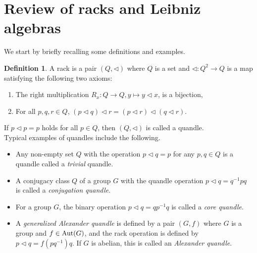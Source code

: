 \documentclass[12pt]{amsart}
\theoremstyle{plain}
\theoremstyle{definition}
\newtheorem{definition}[theorem]{Definition}
\begin{document}
\vspace{5mm}

\section{Review of racks and Leibniz algebras}\label{Sec2}
We start by briefly recalling some definitions and examples.
\begin{definition}
     A rack is a pair $(Q,\triangleleft)$ where $Q$ is a set and $\triangleleft:Q^2 \to Q$ is a map satisfying the following two axioms:

\begin{enumerate}

    \item 
 The right multiplication $R_x: Q \to Q, y \mapsto y \triangleleft x$, is a bijection,

\item 
For all $p,q,r \in Q$, $ (p  \triangleleft q )\triangleleft r = (p  \triangleleft r )\triangleleft (q  \triangleleft r).$ 
\end{enumerate}

\end{definition}
If $p  \triangleleft p=p$ holds for all $p \in Q$, then $(Q,\triangleleft)$ is called a quandle.\\

 Typical examples of quandles include the following. 
  \begin{itemize}

  \item
Any non-empty set $Q$ with the operation $p \triangleleft q=p$ for any $p,q \in Q$ is
a quandle called a  {\it trivial} quandle.

\item
A conjugacy class $Q$ of a group $G$ with the quandle operation $p \triangleleft q=q^{-1}pq $ is called a {\it conjugation quandle}. 

\item
For a group $G$, the binary operation $p \triangleleft q=q p^{-1}q $ is called a {\it core quandle}. 


  \item 
  A {\it generalized Alexander quandle} is defined  by 
a pair $(G, f)$ where 
$G$ is a  group and $f \in {\rm Aut}(G)$,
and the rack operation is defined by 
$p \triangleleft q=f(pq^{-1}) q $. 
If $G$ is abelian, this is called an {\it Alexander quandle}. 

  

\end{itemize}
\end{document}
